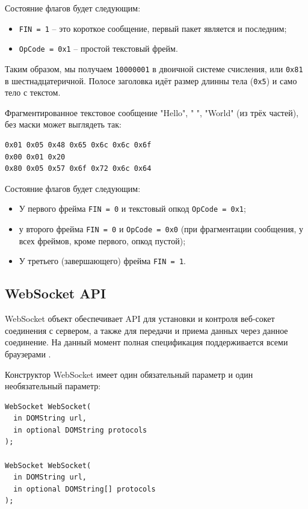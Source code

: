 Состояние флагов будет следующим:
\begin{itemize}
\item \texttt{FIN = 1} -- это короткое сообщение, первый пакет является и последним;
\item \texttt{OpCode = 0x1} -- простой текстовый фрейм.
\end{itemize}

Таким образом, мы получаем \texttt{10000001} в двоичной системе счисления, или \texttt{0x81} в шестнадцатеричной. Полосе заголовка идёт размер длинны тела (\texttt{0x5}) и само тело с текстом.

Фрагментированное текстовое сообщение "Hello", " ", "World" (из трёх частей), без маски может выглядеть так:
\begin{lstlisting}[style=CommandLineStyle]
0x01 0x05 0x48 0x65 0x6c 0x6c 0x6f
0x00 0x01 0x20
0x80 0x05 0x57 0x6f 0x72 0x6c 0x64
\end{lstlisting}

Состояние флагов будет следующим:
\begin{itemize}
\item У первого фрейма \texttt{FIN = 0} и текстовый опкод \texttt{OpCode = 0x1};
\item у второго фрейма \texttt{FIN = 0} и \texttt{OpCode = 0x0} (при фрагментации сообщения, у всех фреймов, кроме первого, опкод пустой);
\item У третьего (завершающего) фрейма \texttt{FIN = 1}.
\end{itemize}

\subsection{WebSocket API}

WebSocket объект обеспечивает API для установки и контроля веб-сокет соединения с сервером, а также для передачи и приема данных через данное соединение. На данный момент полная спецификация поддерживается всеми браузерами \cite{label3}.

Конструктор WebSocket имеет один обязательный параметр и один необязательный параметр:

\begin{lstlisting}[style=CommandLineStyle]
WebSocket WebSocket(
  in DOMString url,
  in optional DOMString protocols
);

WebSocket WebSocket(
  in DOMString url,
  in optional DOMString[] protocols
);
\end{lstlisting}

